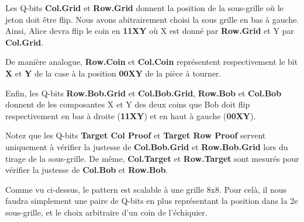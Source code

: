 \documentclass[12pt]{article}
\begin{document}
    \vspace{5mm}

    Les Q-bits \textbf{Col.Grid} et \textbf{Row.Grid} donnent la position de la sous-grille où le jeton doit être flip. Nous avons abitrairement choisi la sous grille en bas à gauche. Ainsi, Alice devra flip le coin en \textbf{11XY} où X est donné par \textbf{Row.Grid} et Y par \textbf{Col.Grid}.

    \vspace{5mm}

    De manière analogue, \textbf{Row.Coin} et \textbf{Col.Coin} représentent respectivement le bit \textbf{X} et \textbf{Y} de la case à la position \textbf{00XY} de la pièce à tourner.

    \vspace{5mm}

    Enfin, les Q-bits \textbf{Row.Bob.Grid} et \textbf{Col.Bob.Grid}, \textbf{Row.Bob} et \textbf{Col.Bob} donnent de les composantes X et Y des deux coins que Bob doit flip respectivement en bas à droite (\textbf{11XY}) et en haut à gauche (\textbf{00XY}).

    \vspace{5mm}
    Notez que les Q-bits \textbf{Target Col Proof} et \textbf{Target Row Proof} servent uniquement à vérifier la justesse de \textbf{Col.Bob.Grid} et \textbf{Row.Bob.Grid} lors du tirage de la sous-grille.
    De même, \textbf{Col.Target} et \textbf{Row.Target} sont mesurés pour vérifier la justesse de \textbf{Col.Bob} et \textbf{Row.Bob}.

    \vspace{10mm}
    Comme vu ci-dessus, le pattern est scalable à une grille 8x8. Pour celà, il nous faudra simplement une paire de Q-bits en plus représentant la position dans la 2e sous-grille, et le choix arbitraire d'un coin de l'échiquier.
\end{document}
